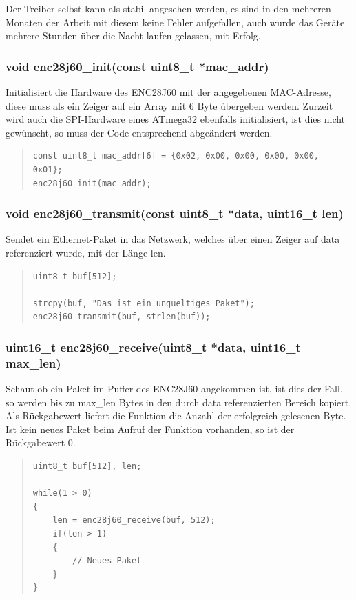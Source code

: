 \documentclass[a4paper,14pt,headsepline]{scrartcl}
\begin{document}
Der Treiber selbst kann als stabil angesehen werden, es sind in den mehreren Monaten der Arbeit mit diesem keine Fehler aufgefallen, auch wurde das Geräte mehrere Stunden über die Nacht laufen gelassen, mit Erfolg.

\subsubsection{void enc28j60\_init(const uint8\_t *mac\_addr)}
Initialisiert die Hardware des ENC28J60 mit der angegebenen MAC-Adresse, diese muss als ein Zeiger auf ein Array mit 6 Byte übergeben werden. Zurzeit wird auch die SPI-Hardware eines ATmega32 ebenfalls initialisiert, ist dies nicht gewünscht, so muss der Code entsprechend abgeändert werden.

\begin{quote}
\begin{verbatim}
const uint8_t mac_addr[6] = {0x02, 0x00, 0x00, 0x00, 0x00, 0x01};
enc28j60_init(mac_addr);
\end{verbatim}
\end{quote}

\subsubsection{void enc28j60\_transmit(const uint8\_t *data, uint16\_t len)}
Sendet ein Ethernet-Paket in das Netzwerk, welches über einen Zeiger auf data referenziert wurde, mit der Länge len.
\begin{quote}
\begin{verbatim}
uint8_t buf[512];

strcpy(buf, "Das ist ein ungueltiges Paket");
enc28j60_transmit(buf, strlen(buf));
\end{verbatim}
\end{quote}

\subsubsection{uint16\_t enc28j60\_receive(uint8\_t *data, uint16\_t max\_len)}
Schaut ob ein Paket im Puffer des ENC28J60 angekommen ist, ist dies der Fall, so werden bis zu max\_len Bytes in den durch data referenzierten Bereich kopiert. Als Rückgabewert liefert die Funktion die Anzahl der erfolgreich gelesenen Byte. Ist kein neues Paket beim Aufruf der Funktion vorhanden, so ist der Rückgabewert 0.
\begin{quote}
\begin{verbatim}
uint8_t buf[512], len;

while(1 > 0)
{
    len = enc28j60_receive(buf, 512);
    if(len > 1)
    {
        // Neues Paket
    }
}
\end{verbatim}
\end{quote}
\end{document}
